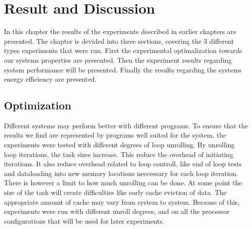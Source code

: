 \chapter[Result and Discussion]{Result and Discussion}
In this chapter the results of the experiments described in earlier chapters are presented.
The chapter is devided into three sections, covering the 3 different types experiments that were run.
First the experimental optimalization towards our systems properties are presented.
Then the experiment results regarding system performance will be presented.
Finally the results regarding the systems energy efficiency are presented.

\section{Optimization}
Different systems may perform better with different programs.
To ensure that the results we find are represented by programs well suited for the system, the experiments were tested with different degrees of loop unrolling.
By unrolling loop iterations, the task sizes increase.
This reduce the overhead of initiating iterations.
It also reduce overhead related to loop controll, like end of loop tests and dataloading into new memory locations neccessary for each loop iteration.
There is however a limit to how much unrolling can be done.
At some point the size of the task will create difficulties like early cache eviction of data.
The appropriate amount of cache may vary from system to system.
Because of this, experiments were run with different unroll degrees, and on all the processor configurations that will be used for later experiments.

